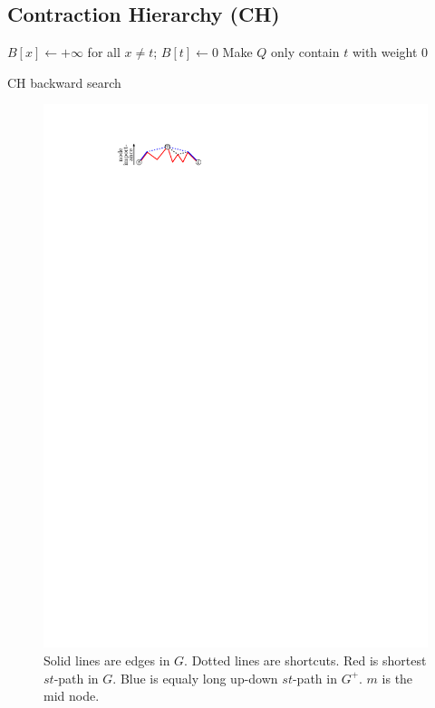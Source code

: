 \documentclass[a4paper,UKenglish,cleveref, autoref, thm-restate]{lipics-v2021}
\begin{document}
\subsection{Contraction Hierarchy (CH)}

\begin{algorithm2e}
$B[x] \leftarrow +\infty$ for all $x\neq t$;
$B[t] \leftarrow 0$\;
Make $Q$ only contain $t$ with weight $0$\;
\caption{CH backward search}
\label{algo:ch-backward}
\end{algorithm2e}

\begin{figure}
\centering
\includegraphics{fig/ch}
\caption{
Solid lines are edges in $G$. Dotted lines are shortcuts. Red is shortest $st$-path in $G$. Blue is equaly long up-down $st$-path in $G^+$. $m$ is the mid node.
}
\label{fig:ch}
\end{figure}
\end{document}

